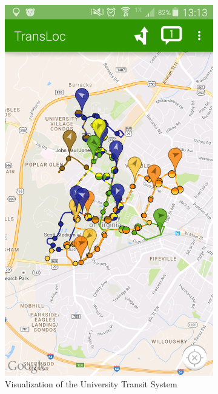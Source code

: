 \documentclass[12pt,letterpaper]{article}
\begin{document}
\begin{figure}[ph!]
\centering
\begin{subfigure}{.5\textwidth}
  \centering
  \includegraphics[width=.9\linewidth]{TL_mobile_1}
    \caption{Visualization of the University Transit System}
  \label{fig:TL_mobile_1}
\end{subfigure}%
\begin{subfigure}{.5\textwidth}
  \centering

\end{subfigure}
\end{figure}
\end{document}
